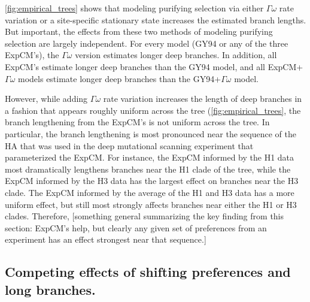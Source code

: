 \documentclass[11pt]{article}
\newcommand\jdbcomment[1]{{\color{red}[#1]}}
\begin{document}
\ref{fig:empirical_trees} shows that modeling purifying selection via either $\Gamma\omega$ rate variation or a site-specific stationary state increases the estimated branch lengths.
But important, the effects from these two methods of modeling purifying selection are largely independent.
For every model (GY94 or any of the three ExpCM's), the $\Gamma\omega$ version estimates longer deep branches.
In addition, all ExpCM's estimate longer deep branches than the GY94 model, and all ExpCM+$\Gamma\omega$ models estimate longer deep branches than the GY94+$\Gamma\omega$ model.

However, while adding $\Gamma\omega$ rate variation increases the length of deep branches in a fashion that appears roughly uniform across the tree (\ref{fig:empirical_trees}, the branch lengthening from the ExpCM's is not uniform across the tree. 
In particular, the branch lengthening is most pronounced near the sequence of the HA that was used in the deep mutational scanning experiment that parameterized the ExpCM.
For instance, the ExpCM informed by the H1 data most dramatically lengthens branches near the H1 clade of the tree, while the ExpCM informed by the H3 data has the largest effect on branches near the H3 clade.
The ExpCM informed by the average of the H1 and H3 data has a more uniform effect, but still most strongly affects branches near either the H1 or H3 clades.
Therefore, \jdbcomment{something general summarizing the key finding from this section: ExpCM's help, but clearly any given set of preferences from an experiment has an effect strongest near that sequence.}

\subsection*{Competing effects of shifting preferences and long branches.}
\end{document}
